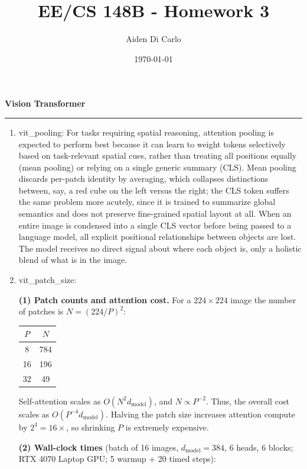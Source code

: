 \documentclass[11pt]{article}
\title{\vspace{-0.7cm}EE/CS 148B - Homework 3}
\date{\today}
\author{Aiden Di Carlo}
\newenvironment{question}[1]
    {
        \begin{center}
        \textbf{#1} \rmfamily
        \bigskip
        \hrule
    }
    {
        \end{center}
    }
\begin{document}
\maketitle

\begin{question}{Vision Transformer}
\begin{enumerate}[label=(\alph*)]

    \item vit\_pooling: For tasks requiring spatial reasoning, attention pooling is expected to perform best because it can learn to weight tokens selectively based on task-relevant spatial cues, rather than treating all positions equally (mean pooling) or relying on a single generic summary (CLS). Mean pooling discards per-patch identity by averaging, which collapses distinctions between, say, a red cube on the left versus the right; the CLS token suffers the same problem more acutely, since it is trained to summarize global semantics and does not preserve fine-grained spatial layout at all. When an entire image is condensed into a single CLS vector before being passed to a language model, all explicit positional relationships between objects are lost. The model receives no direct signal about where each object is, only a holistic blend of what is in the image.

    \item vit\_patch\_size:

    \textbf{(1) Patch counts and attention cost.}
    For a $224\times224$ image the number of patches is $N=(224/P)^2$:

    \begin{center}
    \begin{tabular}{cc}
    \toprule
    $P$ & $N$ \\
    \midrule
    8  & 784 \\
    16 & 196 \\
    32 &  49 \\
    \bottomrule
    \end{tabular}
    \end{center}

    Self-attention scales as $O(N^2 d_\text{model})$, and $N \propto P^{-2}$. Thus, the overall cost scales as $O(P^{-4} d_\text{model})$. Halving the patch size increases attention compute by $2^4 = 16\times$, so shrinking $P$ is extremely expensive.

    \textbf{(2) Wall-clock times} (batch of 16 images, $d_\text{model}=384$, 6 heads, 6 blocks; RTX 4070 Laptop GPU; 5 warmup + 20 timed steps):


\end{enumerate}
\end{question}
\end{document}
